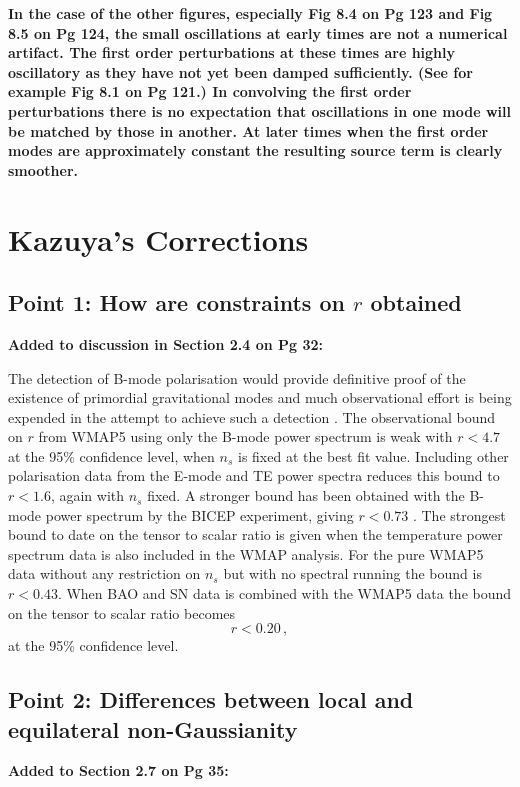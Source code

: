 \textbf{In the case of the other figures, especially Fig 8.4 on Pg 123 and Fig 8.5 on Pg 124, the
small oscillations at early times are not a numerical artifact. The first order perturbations at
these times are highly oscillatory as they have not yet been damped sufficiently. (See for example
Fig 8.1 on Pg 121.) In convolving the first order perturbations there is no expectation that
oscillations in one mode will be matched by those in another. At later times when the first order
modes are approximately constant the resulting source term is clearly smoother. 
}

\section{Kazuya's Corrections}
\subsection{Point 1: How are constraints on $r$ obtained}
\textbf{Added to discussion in Section 2.4 on Pg 32:}

The detection of B-mode polarisation would provide definitive proof of the existence of primordial
gravitational modes and much observational effort is being expended in the attempt to achieve such
a detection \cite{Seljak:1996gy, Baumann:2008aq,Chiang:2009xs,Piacentini2006,Sievers2007,vpj}.
The observational bound on $r$ from WMAP5 using only the B-mode power spectrum
is weak with $r< 4.7$ at the 95\% confidence level, when $n_s$ is fixed at the best fit value.
Including other polarisation data from the E-mode and TE power spectra reduces this bound to
$r<1.6$, again with $n_s$ fixed. A stronger bound has been obtained with the B-mode
power spectrum by the BICEP experiment, giving $r<0.73$ \cite{Chiang:2009xs}. The
strongest bound to date on the tensor to scalar ratio is given when the temperature power spectrum
data is also included in the WMAP analysis. For the pure WMAP5 data without any restriction on
$n_s$ but with no spectral running the bound is $r<0.43$. When BAO and SN data is combined with the
WMAP5 data the bound on the tensor to scalar ratio becomes
% 
\begin{equation}
\label{eq:rbound-intro}
 r < 0.20\,,
\end{equation}
at the 95\% confidence level. 

\subsection{Point 2: Differences between local and equilateral non-Gaussianity}
\textbf{Added to Section 2.7 on Pg 35:}


